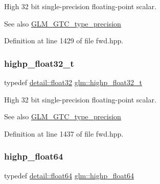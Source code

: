 High 32 bit single-\/precision floating-\/point scalar. \begin{DoxySeeAlso}{See also}
\hyperlink{group__gtc__type__precision}{G\+L\+M\+\_\+\+G\+T\+C\+\_\+type\+\_\+precision} 
\end{DoxySeeAlso}


Definition at line 1429 of file fwd.\+hpp.

\mbox{\label{group__gtc__type__precision_ga4e16a7818d09e2da3b81765999f23928}} 
\subsubsection{\texorpdfstring{highp\+\_\+float32\+\_\+t}{highp\_float32\_t}}
{\footnotesize\ttfamily typedef \hyperlink{namespaceglm_1_1detail_ad60558c5c304624de0b54c51b5857737}{detail\+::float32} \hyperlink{group__gtc__type__precision_ga4e16a7818d09e2da3b81765999f23928}{glm\+::highp\+\_\+float32\+\_\+t}}

High 32 bit single-\/precision floating-\/point scalar. \begin{DoxySeeAlso}{See also}
\hyperlink{group__gtc__type__precision}{G\+L\+M\+\_\+\+G\+T\+C\+\_\+type\+\_\+precision} 
\end{DoxySeeAlso}


Definition at line 1437 of file fwd.\+hpp.

\mbox{\label{group__gtc__type__precision_gab871a78c548d2fa53e1e8ec64a46eee7}} 
\subsubsection{\texorpdfstring{highp\+\_\+float64}{highp\_float64}}
{\footnotesize\ttfamily typedef \hyperlink{namespaceglm_1_1detail_a5a0a9a1be3fd5dbe6d47ae45c3022b06}{detail\+::float64} \hyperlink{group__gtc__type__precision_gab871a78c548d2fa53e1e8ec64a46eee7}{glm\+::highp\+\_\+float64}}

